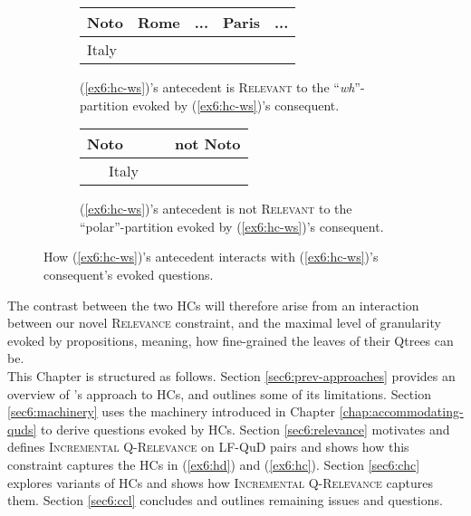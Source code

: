 \begin{figure}[H]
	\centering
	\begin{subfigure}[t]{.47\linewidth}
		\centering
		\begin{tabular}{|lll|ll}
			\hline
			\multicolumn{1}{|l|}{Noto} & \multicolumn{1}{l|}{Rome} & ... & \multicolumn{1}{l|}{Paris} & \multicolumn{1}{l|}{...} \\ \hline
			\multicolumn{3}{|l|}{\cellcolor{blue!20!white}Italy}                             & \multicolumn{2}{l}{}                                  \\ \cline{1-3}
		\end{tabular}
		\caption[]{(\ref{ex6:hc-ws})'s antecedent is \textsc{Relevant} to the ``\textit{wh}''-partition evoked by (\ref{ex6:hc-ws})'s consequent.}\label{tab:italy-not-noto-wh-rel1}
	\end{subfigure}
	\hfill
	\begin{subfigure}[t]{.47\linewidth}
		\centering
		\begin{tabular}{|lllll}
			\hline
			\multicolumn{1}{|l|}{Noto} & \multicolumn{4}{l|}{not Noto} \\ \hline
			\multicolumn{3}{|l|}{\cellcolor{blue!20!white}~~~Italy~~~}                &       &       \\ \cline{1-3}
		\end{tabular}
		\caption[]{(\ref{ex6:hc-ws})'s antecedent is not \textsc{Relevant} to the ``polar''-partition evoked by (\ref{ex6:hc-ws})'s consequent.}\label{tab:italy-not-noto-polar-rel1}
	\end{subfigure}
	\caption[]{How (\ref{ex6:hc-ws})'s antecedent interacts with (\ref{ex6:hc-ws})'s consequent's evoked questions.}
\end{figure}

The contrast between the two HCs will therefore arise from an interaction between our novel \textsc{Relevance} constraint, and the maximal level of granularity evoked by propositions, meaning, how fine-grained the leaves of their Qtrees can be.\\



This Chapter is structured as follows. Section \ref{sec6:prev-approaches} provides an overview of \citeauthor{Kalomoiros2024}'s approach to HCs, and outlines some of its limitations. Section \ref{sec6:machinery} uses the machinery introduced in Chapter \ref{chap:accommodating-quds} to derive questions evoked by HCs. Section \ref{sec6:relevance} motivates and defines \textsc{Incremental Q-Relevance} on LF-QuD pairs and shows how this constraint captures the HCs in (\ref{ex6:hd}) and (\ref{ex6:hc}). Section \ref{sec6:chc} explores variants of HCs and shows how \textsc{Incremental Q-Relevance} captures them. Section \ref{sec6:ccl} concludes and outlines remaining issues and questions.


